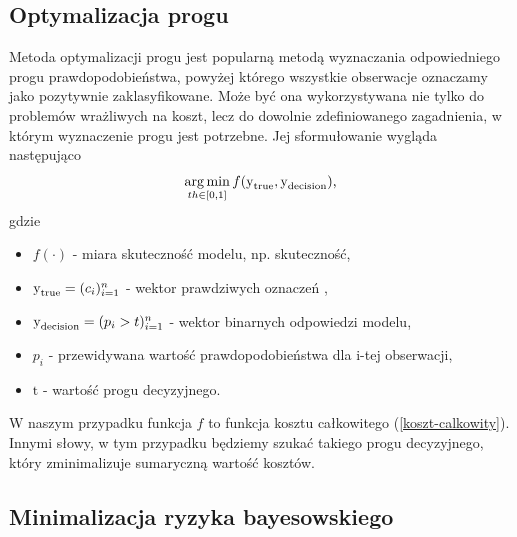 \documentclass[inzynierska]{pwr_wmat_praca_dyplomowa}
\theoremstyle{plain}
\numberwithin{theorem}{chapter}
\theoremstyle{definition}
\numberwithin{theorem}{chapter}
\DeclareMathOperator*{\argmin}{arg\,min}
\begin{document}
\subsection{Optymalizacja progu}
Metoda optymalizacji progu jest popularną metodą wyznaczania odpowiedniego progu prawdopodobieństwa, powyżej którego wszystkie obserwacje oznaczamy jako pozytywnie zaklasyfikowane. Może być ona wykorzystywana nie tylko do problemów wrażliwych na koszt, lecz do dowolnie zdefiniowanego zagadnienia, w którym wyznaczenie progu jest potrzebne. Jej sformułowanie wygląda następująco
$$ \argmin_{th \in [0,1]} f(\ylab{y}{true}, \ylab{y}{decision}) \text{,} $$
gdzie 
\begin{itemize}
	\item $ f(\cdot) $ - miara skuteczność modelu, np. skuteczność,
	\item $ \text{y}_{\text{true}} = (c_i)_{i=1}^n $ - wektor prawdziwych oznaczeń ,
	\item $ \text{y}_{\text{decision}} = (p_i > t)_{i=1}^n $ - wektor binarnych odpowiedzi modelu,
	\item $ p_i $ - przewidywana wartość prawdopodobieństwa dla i-tej obserwacji,
	\item $ \text{t} $ - wartość progu decyzyjnego.
\end{itemize}{}
W naszym przypadku funkcja $f$ to funkcja kosztu całkowitego (\ref{koszt-calkowity}). Innymi słowy, w tym przypadku będziemy szukać takiego progu decyzyjnego, który zminimalizuje sumaryczną wartość kosztów.

\subsection{Minimalizacja ryzyka bayesowskiego}
\end{document}
